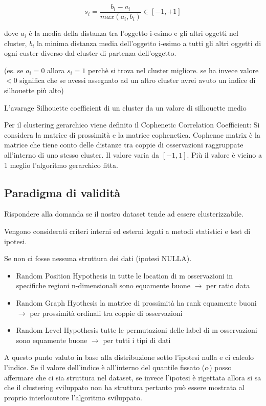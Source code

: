 \[s_i = \frac{b_i - a_i}{max(a_i,b_i)} \in [-1,+1]\]

dove $a_i$ \`e la media della distanza tra l'oggetto i-esimo e gli altri oggetti nel cluster, $b_i$ la minima distanza media dell'oggetto i-esimo a tutti gli altri oggetti di ogni custer diverso dal cluster di partenza dell'oggetto.

(es. se $a_i = 0$ allora $s_i = 1$ perch\`e si trova nel cluster migliore. se ha invece valore $< 0$ significa che se avessi assegnato ad un altro cluster avrei avuto un indice di silhouette pi\`u alto)

L'avarage Silhouette coefficient di un cluster da un valore di silhouette medio 

Per il clustering gerarchico viene definito il Cophenetic Correlation Coefficient: 
Si considera la matrice di prossimit\`a e la matrice cophenetica.
Cophenac matrix \`e la matrice che tiene conto delle distanze tra coppie di osservazioni raggruppate all'interno di uno stesso cluster. Il valore varia da $[-1,1]$. Pi\`u il valore \`e vicino a 1 meglio l'algoritmo gerarchico fitta.

\subsection{Paradigma di validit\`a}
Rispondere alla domanda se il nostro dataset tende ad essere clusterizzabile.

Vengono considerati criteri interni ed esterni legati a metodi statistici e test di ipotesi. 

Se non ci fosse nessuna struttura dei dati (ipotesi NULLA). 

\begin{itemize}
	\item Random Position Hypothesis in tutte le location di m osservazioni in specifiche regioni n-dimensionali sono equamente buone $\rightarrow$ per ratio data
	\item Random Graph Hyothesis la matrice di prossimit\`a ha rank equamente buoni $\rightarrow$ per prossimit\`a ordinali tra coppie di osservazioni
	\item Random Level Hypothesis tutte le permutazioni delle label di m osservazioni sono equamente buone $\rightarrow$ per tutti i tipi di dati
\end{itemize}

A questo punto valuto in base alla distribuzione sotto l'ipotesi nulla e ci calcolo l'indice. Se il valore dell'indice \`e all'interno del quantile fissato ($\alpha$) posso affermare che ci sia struttura nel dataset, se invece l'ipotesi \`e rigettata allora si sa che il clustering sviluppato non ha struttura pertanto pu\`o essere mostrata al proprio interlocutore l'algoritmo sviluppato. 

